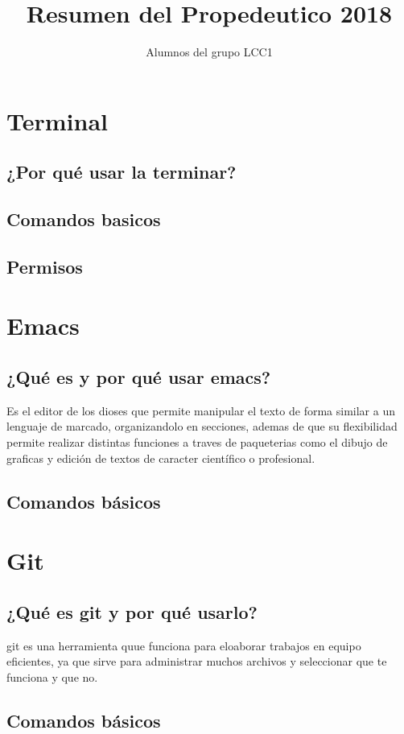 \documentclass[11pt,letterpaper]{article}
\title{Resumen del Propedeutico 2018}
\author{Alumnos del grupo LCC1}
\begin{document}
\maketitle
\section{Terminal}
\subsection{¿Por qué usar la terminar?}
\subsection{Comandos basicos}
\subsection{Permisos}
\section{Emacs}
\subsection{¿Qué es y por qué usar emacs?}
Es el editor de los dioses que permite manipular el texto de forma similar a un lenguaje de marcado, organizandolo en secciones, ademas de que su flexibilidad permite realizar distintas funciones a traves de paqueterias como el dibujo de graficas y edición de textos de caracter científico o profesional.
\subsection{Comandos básicos}

\section{Git}
\subsection{¿Qué es git y por qué usarlo?}
git es una herramienta quue funciona para eloaborar trabajos en equipo eficientes, ya que sirve para administrar muchos archivos y seleccionar que te funciona y que no.
\subsection{Comandos básicos}
\end{document}
